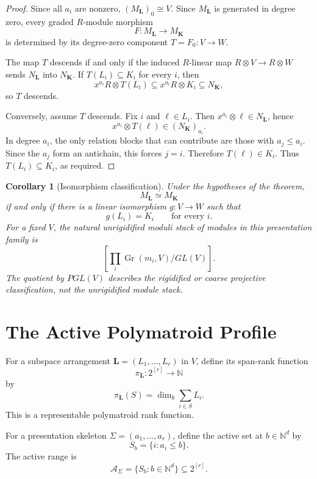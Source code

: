 \documentclass[11pt]{article}
\newtheorem{corollary}[theorem]{Corollary}
\begin{document}
\begin{proof}
Since all \(a_i\) are nonzero, \((M_{\mathbf L})_0\cong V\). Since \(M_{\mathbf L}\) is generated in degree zero, every graded \(R\)-module morphism
\[
F:M_{\mathbf L}\to M_{\mathbf K}
\]
is determined by its degree-zero component \(T=F_0:V\to W\).

The map \(T\) descends if and only if the induced \(R\)-linear map \(R\otimes V\to R\otimes W\) sends \(N_{\mathbf L}\) into \(N_{\mathbf K}\). If \(T(L_i)\subseteq K_i\) for every \(i\), then
\[
x^{a_i}R\otimes T(L_i)
\subseteq
x^{a_i}R\otimes K_i
\subseteq
N_{\mathbf K},
\]
so \(T\) descends.

Conversely, assume \(T\) descends. Fix \(i\) and \(\ell\in L_i\). Then \(x^{a_i}\otimes \ell\in N_{\mathbf L}\), hence
\[
x^{a_i}\otimes T(\ell)\in (N_{\mathbf K})_{a_i}.
\]
In degree \(a_i\), the only relation blocks that can contribute are those with \(a_j\le a_i\). Since the \(a_j\) form an antichain, this forces \(j=i\). Therefore \(T(\ell)\in K_i\). Thus \(T(L_i)\subseteq K_i\), as required.
\end{proof}

\begin{corollary}[Isomorphism classification]
Under the hypotheses of the theorem,
\[
M_{\mathbf L}\simeq M_{\mathbf K}
\]
if and only if there is a linear isomorphism \(g:V\to W\) such that
\[
g(L_i)=K_i
\qquad
\text{for every }i.
\]
For a fixed \(V\), the natural unrigidified moduli stack of modules in this presentation family is
\[
\left[
\prod_i \operatorname{Gr}(m_i,V)/GL(V)
\right].
\]
The quotient by \(PGL(V)\) describes the rigidified or coarse projective classification, not the unrigidified module stack.
\end{corollary}

\section{The Active Polymatroid Profile}

For a subspace arrangement \(\mathbf L=(L_1,\ldots,L_r)\) in \(V\), define its span-rank function
\[
\pi_{\mathbf L}:2^{[r]}\to\mathbb N
\]
by
\[
\pi_{\mathbf L}(S)=
\dim_k\sum_{i\in S}L_i.
\]
This is a representable polymatroid rank function.

For a presentation skeleton \(\Sigma=(a_1,\ldots,a_r)\), define the active set at \(b\in\mathbb N^d\) by
\[
S_b=\{i:a_i\le b\}.
\]
The active range is
\[
\mathcal A_\Sigma=\{S_b:b\in\mathbb N^d\}
\subseteq
2^{[r]}.
\]
\end{document}

